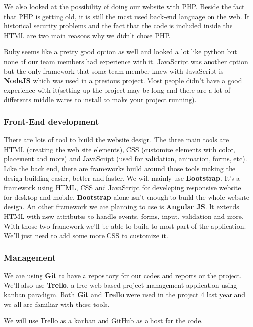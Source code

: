 We also looked at the possibility of doing our website with PHP. Beside the fact that PHP is getting old, it is still the most used back-end language on the web. It historical security problems and the fact that the code is included inside the HTML are two main reasons why we didn't chose PHP.\newline

Ruby seems like a pretty good option as well and looked a lot like python but none of our team members had experience with it. JavaScript was another option but the only framework that some team member knew with JavaScript is \textbf{NodeJS} which was used in a previous project. Most people didn't have a good experience with it(setting up the project may be long and there are a lot of differents middle wares to install to make your project running).

\subsubsection{Front-End development}

There are lots of tool to build the website design. The three main tools are HTML (creating the web site elements), CSS (customize elements with color, placement and more) and JavaScript (used for validation, animation, forms, etc). Like the back end, there are frameworks build around those tools making the design building easier, better and faster. We will mainly use \textbf{Bootstrap}. It's a framework using HTML, CSS and JavaScript for developing responsive website for desktop and mobile. \textbf{Bootstrap} alone isn't enough to build the whole website design. An other framework we are planning to use is \textbf{Angular JS}. It extends HTML with new attributes to handle events, forms, input, validation and more. With those two framework we'll be able to build to most part of the application. We'll just need to add some more CSS to customize it.

\subsubsection{Management}

We are using \textbf{Git} to have a repository for our codes and reports or the project. We'll also use \textbf{Trello}, a free web-based project management application using kanban paradigm. Both \textbf{Git} and \textbf{Trello} were used in the project 4 last year and we all are familiar with these tools.

We will use Trello as a kanban and GitHub as a host for the code. \newline

